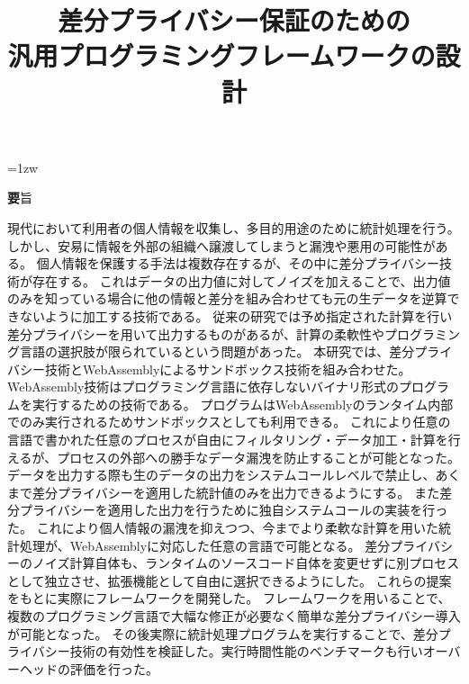 \documentclass[a4paper,11pt]{jreport}
\title{差分プライバシー保証のための \\ 汎用プログラミングフレームワークの設計}
\author{}
\begin{document}
\maketitle
\thispagestyle{empty}
\newpage

\thispagestyle{empty}
\vspace*{20pt plus 1fil}
\parindent=1zw
\noindent
\begin{center}
{\Large \textbf 要旨}
\vspace{2cm}
\end{center}
現代において利用者の個人情報を収集し、多目的用途のために統計処理を行う。
しかし、安易に情報を外部の組織へ譲渡してしまうと漏洩や悪用の可能性がある。
個人情報を保護する手法は複数存在するが、その中に差分プライバシー技術が存在する。
これはデータの出力値に対してノイズを加えることで、出力値のみを知っている場合に他の情報と差分を組み合わせても元の生データを逆算できないように加工する技術である。
従来の研究では予め指定された計算を行い差分プライバシーを用いて出力するものがあるが、計算の柔軟性やプログラミング言語の選択肢が限られているという問題があった。
本研究では、差分プライバシー技術とWebAssemblyによるサンドボックス技術を組み合わせた。
WebAssembly技術はプログラミング言語に依存しないバイナリ形式のプログラムを実行するための技術である。
プログラムはWebAssemblyのランタイム内部でのみ実行されるためサンドボックスとしても利用できる。
これにより任意の言語で書かれた任意のプロセスが自由にフィルタリング・データ加工・計算を行えるが、プロセスの外部への勝手なデータ漏洩を防止することが可能となった。
データを出力する際も生のデータの出力をシステムコールレベルで禁止し、あくまで差分プライバシーを適用した統計値のみを出力できるようにする。
また差分プライバシーを適用した出力を行うために独自システムコールの実装を行った。
これにより個人情報の漏洩を抑えつつ、今までより柔軟な計算を用いた統計処理が、WebAssemblyに対応した任意の言語で可能となる。
差分プライバシーのノイズ計算自体も、ランタイムのソースコード自体を変更せずに別プロセスとして独立させ、拡張機能として自由に選択できるようにした。
これらの提案をもとに実際にフレームワークを開発した。
フレームワークを用いることで、複数のプログラミング言語で大幅な修正が必要なく簡単な差分プライバシー導入が可能となった。
その後実際に統計処理プログラムを実行することで、差分プライバシー技術の有効性を検証した。実行時間性能のベンチマークも行いオーバーヘッドの評価を行った。

\par
\vspace{0pt plus 1fil}
\newpage

\tableofcontents
\listoffigures
\end{document}
